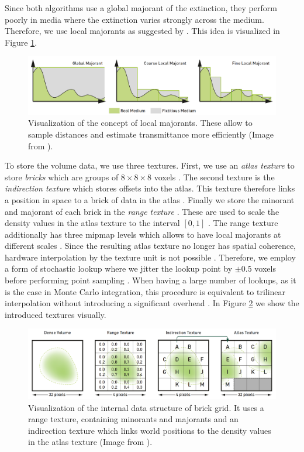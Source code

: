 Since both algorithms use a global majorant of the extinction, they perform poorly in media where the extinction varies strongly across the medium.
Therefore, we use local majorants as suggested by \citeauthor{brick_grid} \cite{brick_grid}.
This idea is visualized in Figure \ref{fig:brick_grid_majorants}.
\begin{figure}[t]
    \centering
    \includegraphics[width=0.9\linewidth]{img/brick_grid_majorants.png}
    \caption[Visualization of local density majorants]{Visualization of the concept of local majorants. These allow to sample distances and estimate transmittance more efficiently (Image from \cite{brick_grid}).}
    \label{fig:brick_grid_majorants}
\end{figure}
To store the volume data, we use three textures.
First, we use an \textit{atlas texture} to store \textit{bricks} which are groups of $8 \times 8 \times 8$ voxels \cite{brick_grid}.
The second texture is the \textit{indirection texture} which stores offsets into the atlas.
This texture therefore links a position in space to a brick of data in the atlas \cite{brick_grid}.
Finally we store the minorant and majorant of each brick in the \textit{range texture} \cite{brick_grid}.
These are used to scale the density values in the atlas texture to the interval $[0, 1]$ \cite{brick_grid}.
The range texture additionally has three mipmap levels which allows to have local majorants at different scales \cite{brick_grid}.
Since the resulting atlas texture no longer has spatial coherence, hardware interpolation by the texture unit is not possible \cite{brick_grid}.
Therefore, we employ a form of stochastic lookup where we jitter the lookup point by $\pm0.5$ voxels before performing point sampling \cite{brick_grid}.
When having a large number of lookups, as it is the case in Monte Carlo integration, this procedure is equivalent to trilinear interpolation without introducing a significant overhead \cite{brick_grid}.
In Figure \ref{fig:brick_grid_datastructure} we show the introduced textures visually.
\begin{figure}[t]
    \centering
    \includegraphics[width=0.9\linewidth]{img/brick_grid_datastructure.png}
    \caption[Data structure of brick grid]{Visualization of the internal data structure of brick grid. It uses a range texture, containing minorants and majorants and an indirection texture which links world positions to the density values in the atlas texture (Image from \cite{brick_grid}).}
    \label{fig:brick_grid_datastructure}
\end{figure}

